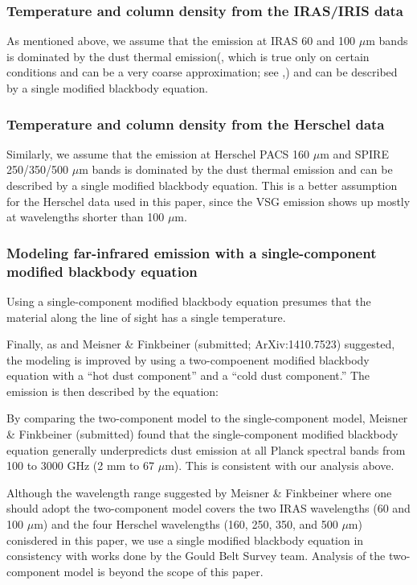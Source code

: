 \documentclass{emulateapj}
\begin{document}
\subsubsection{Temperature and column density from the IRAS/IRIS data}
As mentioned above, we assume that the emission at IRAS 60 and 100 $\mu$m bands is dominated by the dust thermal emission(, which is true only on certain conditions and can be a very coarse approximation; see \citet{Schnee_2007},) and can be described by a single modified blackbody equation. 

\subsubsection{Temperature and column density from the Herschel data}
Similarly, we assume that the emission at Herschel PACS 160 $\mu$m and SPIRE 250/350/500 $\mu$m bands is dominated by the dust thermal emission and can be described by a single modified blackbody equation. This is a better assumption for the Herschel data used in this paper, since the VSG emission shows up mostly at wavelengths shorter than 100 $\mu$m.

\subsubsection{Modeling far-infrared emission with a single-component modified blackbody equation}
Using a single-component modified blackbody equation presumes that the material along the line of sight has a single temperature.

Finally, as \citet{Finkbeiner_1999} and Meisner \& Finkbeiner (submitted; ArXiv:1410.7523) suggested, the modeling is improved by using a two-compoenent modified blackbody equation with a ``hot dust component'' and a ``cold dust component.'' The emission is then described by the equation:

By comparing the two-component model to the single-component model, Meisner \& Finkbeiner (submitted) found that the single-component modified blackbody equation generally underpredicts dust emission at all Planck spectral bands from 100 to 3000 GHz (2 mm to 67 $\mu$m). This is consistent with our analysis above.

Although the wavelength range suggested by Meisner \& Finkbeiner where one should adopt the two-component model covers the two IRAS wavelengths (60 and 100 $\mu$m) and the four Herschel wavelengths (160, 250, 350, and 500 $\mu$m) conisdered in this paper, we use a single modified blackbody equation in consistency with works done by the Gould Belt Survey team. Analysis of the two-component model is beyond the scope of this paper.
\end{document}
